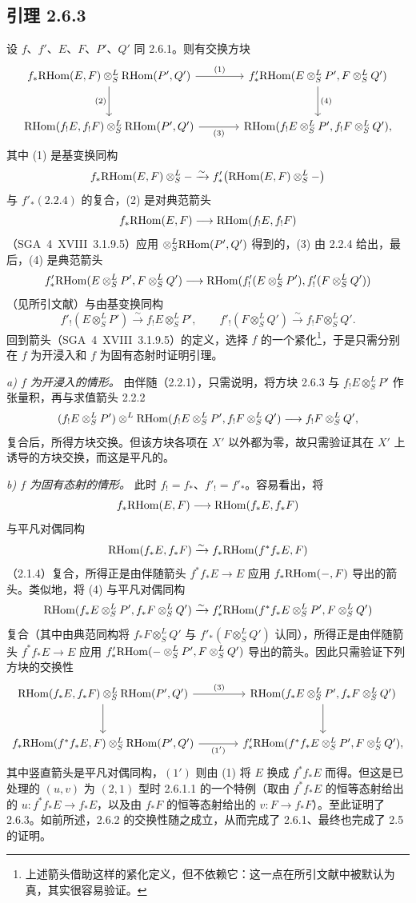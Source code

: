 \subsection*{引理 2.6.3}
设 $f$、$f'$、$E$、$F$、$P'$、$Q'$ 同 2.6.1。则有交换方块
\[
\begin{tikzcd}[column sep=large,row sep=large]
f_*\RHom(E,F)\otimes^L_S\RHom(P',Q') \arrow[r,"(1)"] \arrow[d,"(2)"'] & f'_*\RHom(E\otimes^L_SP',F\otimes^L_SQ') \arrow[d,"(4)"]\\
\RHom(f_!E,f_!F)\otimes^L_S\RHom(P',Q') \arrow[r,"(3)"'] & \RHom(f_!E\otimes^L_SP',f_!F\otimes^L_SQ'),
\end{tikzcd}
\]
其中 (1) 是基变换同构
\[
f_*\mathrm{RHom}(E,F)\otimes^L_S -\xrightarrow{\sim}f'_*\bigl(\mathrm{RHom}(E,F)\otimes^L_S-\bigr)
\]
与 $f'_*(2.2.4)$ 的复合，(2) 是对典范箭头
\[
f_*\mathrm{RHom}(E,F)\longrightarrow\mathrm{RHom}(f_!E,f_!F)
\]
（SGA~4~XVIII~3.1.9.5）应用 $\otimes^L_S\mathrm{RHom}(P',Q')$ 得到的，(3) 由 2.2.4 给出，最后，(4) 是典范箭头
\[
f'_*\mathrm{RHom}(E\otimes^L_SP',F\otimes^L_SQ')
\longrightarrow
\mathrm{RHom}(f'_!(E\otimes^L_SP'),f'_!(F\otimes^L_SQ'))
\]
（见所引文献）与由基变换同构
\[
f'_!(E\otimes^L_SP')\xrightarrow{\sim}f_!E\otimes^L_SP',
\qquad
f'_!(F\otimes^L_SQ')\xrightarrow{\sim}f_!F\otimes^L_SQ'.
\]
回到箭头（SGA~4~XVIII~3.1.9.5）的定义，选择 $f$ 的一个紧化\footnote{上述箭头借助这样的紧化定义，但不依赖它：这一点在所引文献中被默认为真，其实很容易验证。}，于是只需分别在 $f$ 为开浸入和 $f$ 为固有态射时证明引理。

\emph{a) $f$ 为开浸入的情形。} 由伴随（2.2.1），只需说明，将方块 2.6.3 与 $f_!E\otimes^L_SP'$ 作张量积，再与求值箭头 2.2.2
\[
(f_!E\otimes^L_SP')\otimes^L\mathrm{RHom}(f_!E\otimes^L_SP',f_!F\otimes^L_SQ')\longrightarrow f_!F\otimes^L_SQ',
\]
复合后，所得方块交换。但该方块各项在 $X'$ 以外都为零，故只需验证其在 $X'$ 上诱导的方块交换，而这是平凡的。

\emph{b) $f$ 为固有态射的情形。} 此时 $f_!=f_*$、$f'_!=f'_*$。容易看出，将
\[
f_*\mathrm{RHom}(E,F)\longrightarrow\mathrm{RHom}(f_*E,f_*F)
\]
与平凡对偶同构
\[
\mathrm{RHom}(f_*E,f_*F)\xrightarrow{\sim}f_*\mathrm{RHom}(f^{*}f_*E,F)
\]
（2.1.4）复合，所得正是由伴随箭头 $f^{*}f_*E\to E$ 应用 $f_*\mathrm{RHom}(-,F)$ 导出的箭头。类似地，将 (4) 与平凡对偶同构
\[
\mathrm{RHom}(f_*E\otimes^L_SP',f_*F\otimes^L_SQ')\xrightarrow{\sim}f'_*\mathrm{RHom}(f^{*}f_*E\otimes^L_SP',F\otimes^L_SQ')
\]
复合（其中由典范同构将 $f_*F\otimes^L_SQ'$ 与 $f'_*(F\otimes^L_SQ')$ 认同），所得正是由伴随箭头 $f^{*}f_*E\to E$ 应用 $f'_*\mathrm{RHom}(-\otimes^L_SP',F\otimes^L_SQ')$ 导出的箭头。因此只需验证下列方块的交换性
\[
\begin{tikzcd}[column sep=large,row sep=large]
\RHom(f_*E,f_*F)\otimes^L_S\RHom(P',Q') \arrow[r,"(3)"] \arrow[d] & \RHom(f_*E\otimes^L_SP',f_*F\otimes^L_SQ') \arrow[d]\\
f_*\RHom(f^{*}f_*E,F)\otimes^L_S\RHom(P',Q') \arrow[r,"(1')"'] & f'_*\RHom(f^{*}f_*E\otimes^L_SP',F\otimes^L_SQ'),
\end{tikzcd}
\]
其中竖直箭头是平凡对偶同构，$(1')$ 则由 (1) 将 $E$ 换成 $f^{*}f_*E$ 而得。但这是已处理的 $(u,v)$ 为 $(2,1)$ 型时 2.6.1.1 的一个特例（取由 $f^{*}f_*E$ 的恒等态射给出的 $u:f^{*}f_*E\to f_*E$，以及由 $f_*F$ 的恒等态射给出的 $v:F\to f_*F$）。至此证明了 2.6.3。如前所述，2.6.2 的交换性随之成立，从而完成了 2.6.1、最终也完成了 2.5 的证明。

